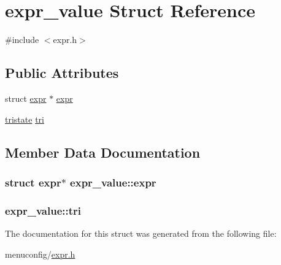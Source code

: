 \hypertarget{structexpr__value}{\section{expr\-\_\-value Struct Reference}
\label{structexpr__value}
}


{\ttfamily \#include $<$expr.\-h$>$}

\subsection*{Public Attributes}
\begin{DoxyCompactItemize}
\item 
struct \hyperlink{structexpr}{expr} $\ast$ \hyperlink{structexpr__value_a5c4fc8a5d77e333c6b38737ce4a917a7}{expr}
\item 
\hyperlink{expr_8h_af4926743b1e532e0b2ad24161ff942a3}{tristate} \hyperlink{structexpr__value_a2f00ccba85b3efe3e215cef78c9fad67}{tri}
\end{DoxyCompactItemize}


\subsection{Member Data Documentation}
\hypertarget{structexpr__value_a5c4fc8a5d77e333c6b38737ce4a917a7}{
\subsubsection[{expr}]{\setlength{\rightskip}{0pt plus 5cm}struct {\bf expr}$\ast$ expr\-\_\-value\-::expr}}\label{structexpr__value_a5c4fc8a5d77e333c6b38737ce4a917a7}
\hypertarget{structexpr__value_a2f00ccba85b3efe3e215cef78c9fad67}{
\subsubsection[{tri}]{ expr\-\_\-value\-::tri}}\label{structexpr__value_a2f00ccba85b3efe3e215cef78c9fad67}


The documentation for this struct was generated from the following file\-:\begin{DoxyCompactItemize}
\item 
menuconfig/\hyperlink{expr_8h}{expr.\-h}\end{DoxyCompactItemize}
